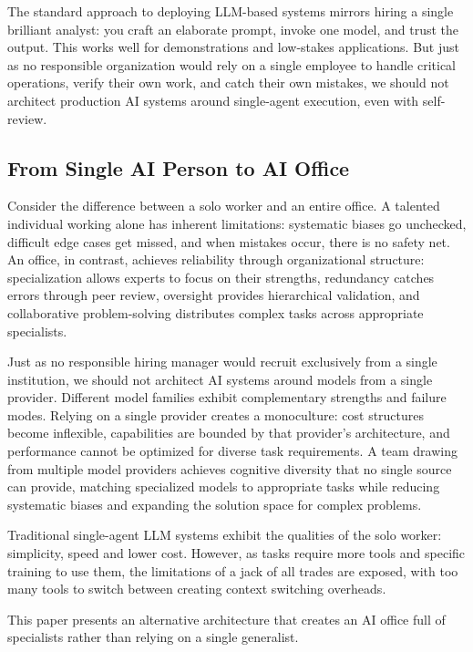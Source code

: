 \documentclass[sigconf]{acmart}
\newcommand{\reviewnote}[1]{}
\newcommand{\reviewnote}[1]{\marginnote{\raggedright\footnotesize\textit{#1}}}
\begin{document}
The standard approach to deploying LLM-based systems mirrors hiring a single brilliant analyst: you craft an elaborate prompt, invoke one model, and trust the output. This works well for demonstrations and low-stakes applications. But just as no responsible organization would rely on a single employee to handle critical operations, verify their own work, and catch their own mistakes, we should not architect production AI systems around single-agent execution, even with self-review.

\subsection{From Single AI Person to AI Office}

Consider the difference between a solo worker and an entire office. A talented individual working alone has inherent limitations: systematic biases go unchecked, difficult edge cases get missed, and when mistakes occur, there is no safety net. An office, in contrast, achieves reliability through organizational structure: specialization allows experts to focus on their strengths, redundancy catches errors through peer review, oversight provides hierarchical validation, and collaborative problem-solving distributes complex tasks across appropriate specialists.

Just as no responsible hiring manager would recruit exclusively from a single institution, we should not architect AI systems around models from a single provider. Different model families exhibit complementary strengths and failure modes. Relying on a single provider creates a monoculture: cost structures become inflexible, capabilities are bounded by that provider's architecture, and performance cannot be optimized for diverse task requirements. A team drawing from multiple model providers achieves cognitive diversity that no single source can provide, matching specialized models to appropriate tasks while reducing systematic biases and expanding the solution space for complex problems.


Traditional single-agent LLM systems exhibit the qualities of the solo worker: simplicity, speed and lower cost. However, as tasks require more tools and specific training to use them, the limitations of a jack of all trades are exposed, with too many tools to switch between creating context switching overheads.

This paper presents an alternative architecture that creates an AI office full of specialists rather than relying on a single generalist.\reviewnote{Good framing. The office metaphor is intuitive---make sure this carries through consistently to Section 3.}
\end{document}
